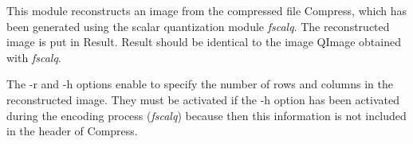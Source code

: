 This module reconstructs an image from the compressed file Compress, 
which has been generated using the scalar quantization 
module {\em fscalq}. 
The reconstructed image is put in Result. Result should be identical 
to the image QImage obtained with {\em fscalq}. 

The -r and -h options enable to specify the number of rows and columns 
in the reconstructed image. They must be activated if the -h option has 
been activated during the encoding process ({\em fscalq}) because then this 
information is not included in the header of Compress. 
